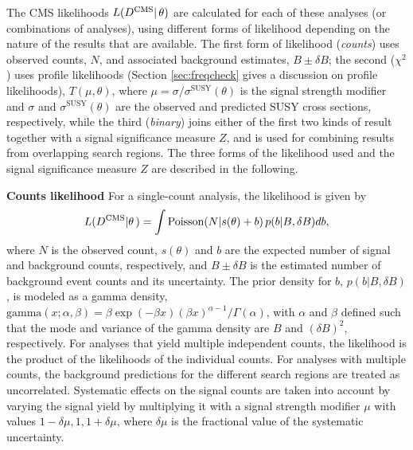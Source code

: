  

The CMS likelihoods $L(D^{\text{CMS}}|\,\theta)$ are calculated for each of these analyses (or combinations of analyses), using different forms of likelihood depending on the nature of the results that are available.
The first form of likelihood (\emph{counts}) uses observed counts,
$N$, and associated background estimates, $B \pm \delta B$; the second
($\chi^2$) uses profile likelihoods (Section \ref{sec:freqcheck} gives a discussion on profile likelihoods), 
$T(\mu, \theta)$, where $\mu =
\sigma / \sigma^\textrm{SUSY}(\theta)$ is the signal strength modifier
and $\sigma$ and $\sigma^\textrm{SUSY}(\theta)$ are the observed and
predicted SUSY cross sections, respectively, while the third
(\emph{binary}) joins either of the first two kinds of result together
with a signal significance measure $Z$, and is used for combining
results from overlapping search regions. The three forms of the
likelihood used and the signal significance measure $Z$ are described in the following.


\textbf{Counts likelihood}
For a single-count analysis, the likelihood is given by  
\begin{equation}
L(D^{\text{CMS}}|\theta\,) = \int \textrm{Poisson}(N | s(\theta) + b) \, p(b|B, \delta B) db,
\label{eq:lhd_counts}
\end{equation}
where $N$ is the observed count,
$s(\theta)$ and $b$ are the expected number of signal and background counts, respectively,
and $B \pm\delta B$ is the estimated number of background event counts and its uncertainty.
The prior density for $b$, $p(b|B, \delta B)$, is modeled as a gamma density, 
$\textrm{gamma}(x;\alpha,\beta) = \beta \exp(-\beta x)  (\beta x)^{\alpha-1}/\Gamma(\alpha)$,
with $\alpha$ and $\beta$ defined such that the mode and variance of the gamma density are  $B$ and $(\delta B)^2$, respectively. 
For analyses that yield multiple independent counts, the likelihood is
the product of the likelihoods of the individual counts. For analyses
with multiple counts, the background predictions for the different search regions are treated as uncorrelated.  Systematic effects on the signal counts are taken into account by varying the signal yield by multiplying it with a signal strength modifier $\mu$ with values $1-\delta\mu, 1, 1+\delta\mu$, where $\delta\mu$ is the fractional value of the systematic uncertainty.

